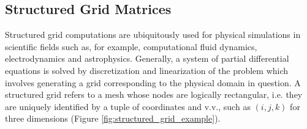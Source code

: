 \documentclass{article}
\begin{document}
  \subsection{Structured Grid Matrices}

    Structured grid computations are ubiquitously used for physical simulations in scientific fields such as, for example, computational fluid dynamics, electrodynamics and astrophysics. Generally, a system of partial differential equations is solved by discretization and linearization of the problem which involves generating a grid corresponding to the physical domain in question. A structured grid refers to a mesh whose nodes are logically rectangular, i.e. they are uniquely identified by a tuple of coordinates and v.v., such as $(i, j, k)$ for three dimensions (Figure \ref{fig:structured_grid_example}).
\end{document}
